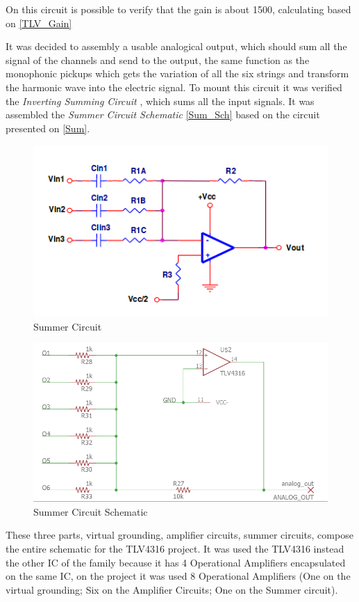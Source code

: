 On this circuit is possible to verify that the gain is about 1500, calculating based on \autoref{TLV_Gain}

It was decided to assembly a usable analogical output, which should sum all the signal of the channels and send to the output, the same function as the monophonic pickups which gets
the variation of all the six strings and transform the harmonic wave into the electric signal. To mount this circuit it was verified the \textit{Inverting Summing Circuit} \cite{OpAmps},
which sums all the input signals. It was assembled the \textit{Summer Circuit Schematic} \autoref{Sum_Sch} based on the circuit presented on \autoref{Sum}.

\begin{figure}[!htpb]
\centering
\caption{Summer Circuit}
\label{Sum}
\includegraphics[scale=1]{images/sum}
\end{figure}

\begin{figure}[!htpb]
\centering
\caption{Summer Circuit Schematic}
\label{Sum_Sch}
\includegraphics[scale=0.3]{images/tlv_sum}
\end{figure}

These three parts, virtual grounding, amplifier circuits, summer circuits, compose the entire schematic for the TLV4316 project. It was used the TLV4316 instead the other IC of the family
because it has 4 Operational Amplifiers encapsulated on the same IC, on the project it was used 8 Operational Amplifiers (One on the virtual grounding; Six on the Amplifier Circuits; One on
the Summer circuit).\\

